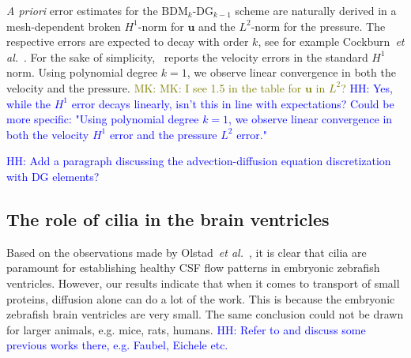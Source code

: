 \documentclass[fleqn]{wlscirep}
\newcommand{\uu}{\mathbf{u}}
\newcommand{\lyng}[1]{\textcolor{blue}{#1}}
\newcommand{\mk}[1]{\textcolor{olive}{MK: #1}}
\begin{document}

\emph{A priori} error estimates for the $\mathrm{BDM}_k$-$\mathrm{DG}_{k-1}$ scheme are naturally 
derived in a mesh-dependent broken $H^1$-norm for $\uu$ and the $L^2$-norm for the pressure. The respective 
errors are expected to decay with order $k$, see for example Cockburn~\emph{et al.}~\cite{Cockburn2005AEquations}. For the sake of simplicity,~ reports the velocity errors in the standard $H^1$ norm. Using polynomial degree  
$k=1$, we observe linear convergence in both the velocity and the pressure.   
\mk{MK: I see 1.5 in the table for $\uu$ in $L^2$?} \lyng{HH: Yes, while the $H^1$ error decays linearly, isn't this in line with expectations? Could be more specific: "Using polynomial degree 
$k=1$, we observe linear convergence in both the velocity $H^1$ error and the pressure $L^2$ error."}

\lyng{HH: Add a paragraph discussing the advection-diffusion equation discretization with DG elements?}

\subsection*{The role of cilia in the brain ventricles}
Based on the observations made by Olstad~\emph{et al.}~\cite{Olstad2019CiliaryDevelopment}, it is clear that cilia are paramount for establishing healthy CSF flow patterns in embryonic zebrafish ventricles. However, our results indicate that when it comes to transport of small proteins, diffusion alone can do a lot of the work. This is because the embryonic zebrafish brain ventricles are very small. The same conclusion could not be drawn for larger animals, e.g. mice, rats, humans. \lyng{HH: Refer to and discuss some previous works there, e.g. Faubel, Eichele etc.}

\end{document}
